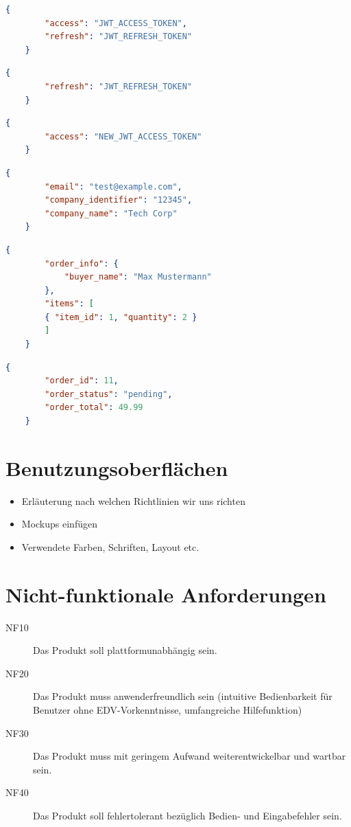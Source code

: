 \documentclass[%
	12pt,
	a4paper,
	oneside,
	parskip=full
]{scrbook}
\begin{document}
\begin{lstlisting}[language=json, caption={Response für Login}, label=lst:login-response]
	{
		"access": "JWT_ACCESS_TOKEN",
		"refresh": "JWT_REFRESH_TOKEN"
	}
\end{lstlisting}

\begin{lstlisting}[language=json, caption={Request für Token Refresh}, label=lst:refresh-request]
	{
		"refresh": "JWT_REFRESH_TOKEN"
	}
\end{lstlisting}

\begin{lstlisting}[language=json, caption={Response für Token Refresh}, label=lst:refresh-response]
	{
		"access": "NEW_JWT_ACCESS_TOKEN"
	}
\end{lstlisting}

\begin{lstlisting}[language=json, caption={Response für Profilabruf}, label=lst:profile-response]
	{
		"email": "test@example.com",
		"company_identifier": "12345",
		"company_name": "Tech Corp"
	}
\end{lstlisting}

\begin{lstlisting}[language=json, caption={Request für Bestellungen}, label=lst:order-request]
	{
		"order_info": {
			"buyer_name": "Max Mustermann"
		},
		"items": [
		{ "item_id": 1, "quantity": 2 }
		]
	}
\end{lstlisting}

\begin{lstlisting}[language=json, caption={Response für Bestellungen}, label=lst:order-response]
	{
		"order_id": 11,
		"order_status": "pending",
		"order_total": 49.99
	}
\end{lstlisting}

\chapter{Benutzungsoberflächen}
\begin{itemize}
	\item Erläuterung nach welchen Richtlinien wir uns richten
	\item Mockups einfügen
	\item Verwendete Farben, Schriften, Layout etc.
\end{itemize}

\chapter{Nicht-funktionale Anforderungen}
\begin{description}
	\item[NF10] Das Produkt soll plattformunabhängig sein.
	\item[NF20] Das Produkt muss anwenderfreundlich sein (intuitive Bedienbarkeit für Benutzer ohne EDV-Vorkenntnisse, umfangreiche Hilfefunktion)
	\item[NF30] Das Produkt muss mit geringem Aufwand weiterentwickelbar und wartbar sein.
	\item[NF40] Das Produkt soll fehlertolerant bezüglich Bedien- und Eingabefehler sein.
\end{description}
\end{document}
